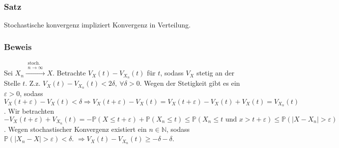 \subsubsection{Satz}
Stochastische konvergenz impliziert Konvergenz in Verteilung.
\subsubsection{Beweis}
Sei $X_n\xrightarrow{\substack{\text{stoch.}\\n\to\infty}}X$. Betrachte $V_X(t)-V_{X_n}(t)$ f\"ur $t$, sodass $V_X$ stetig an der Stelle $t$. Z.z. $V_X(t)-V_{X_n}(t)<2\delta,\ \forall\delta>0$. Wegen der Stetigkeit gibt es ein $\varepsilon>0$, sodass $V_X(t+\varepsilon)-V_X(t)<\delta\Rightarrow V_X(t+\varepsilon)-V_X(t)=V_X(t+\varepsilon)-V_X(t)+V_X(t)=V_{X_n}(t)$. Wir betrachten $-V_X(t+\varepsilon)+V_{X_n}(t)=-\mathbb{P}(X\leq t+\varepsilon)+\mathbb{P}(X_n\leq t)\leq\mathbb{P}(X_n\leq t\text{ und }x>t+\varepsilon)\leq\mathbb{P}(|X-X_n|>\varepsilon)$. Wegen stochastischer Konvergenz existiert ein $n\in\mathbb{N}$, sodass $\mathbb{P}(|X_n-X|>\varepsilon)<\delta$. $\Rightarrow V_X(t)-V_{X_n}(t)\geq-\delta-\delta$.
